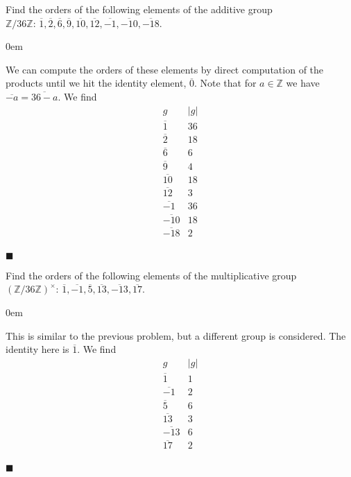 \documentclass[12pt]{article}
\renewcommand{\qed}{\hfill$\blacksquare$}
\renewenvironment{proof}{\begin{addmargin}[1em]{0em}\begin{newproof}}{\end{newproof}\end{addmargin}\qed}
\newenvironment{problem}[2][Exercise]{\begin{trivlist}
\item[\hskip \labelsep {\bfseries #1}\hskip \labelsep {\bfseries #2.}]}{\end{trivlist}}
\begin{document}
\begin{problem}{1.1.13}
Find the orders of the following elements of the additive group $\mathbb{Z}/36\mathbb{Z}: \, \overline{1},\overline{2},\overline{6},\overline{9},\overline{10},\overline{12},\overline{-1},\overline{-10},\overline{-18}$.
\end{problem}
\begin{proof}
We can compute the orders of these elements by direct computation of the products until we hit the identity element, $\overline{0}$. Note that for $a\in \mathbb{Z}$ we have $\overline{-a} = \overline{36-a}$. We find
\begin{equation*}
    \begin{array}{c|c}
        g & \left|g\right| \\ \hline
        \overline{1} & 36 \\
        \overline{2} & 18 \\
        \overline{6} & 6 \\
        \overline{9} & 4 \\
        \overline{10} & 18 \\
        \overline{12} & 3 \\
        \overline{-1} & 36 \\
        \overline{-10} & 18 \\
        \overline{-18} & 2 \\
    \end{array}
\end{equation*}
\end{proof}


\begin{problem}{1.1.14}
Find the orders of the following elements of the multiplicative group $\left(\mathbb{Z}/36\mathbb{Z}\right)^{\times}: \, \overline{1},\overline{-1},\overline{5},\overline{13},\overline{-13},\overline{17}$.
\end{problem}
\begin{proof}
This is similar to the previous problem, but a different group is considered. The identity here is $\overline{1}$. We find
\begin{equation*}
    \begin{array}{c|c}
    g & \left|g\right| \\ \hline
    \overline{1} & 1 \\
    \overline{-1} & 2 \\
    \overline{5} & 6 \\
    \overline{13} & 3 \\
    \overline{-13} & 6 \\
    \overline{17} & 2 \\
    \end{array}
\end{equation*}
\end{proof}
\end{document}
